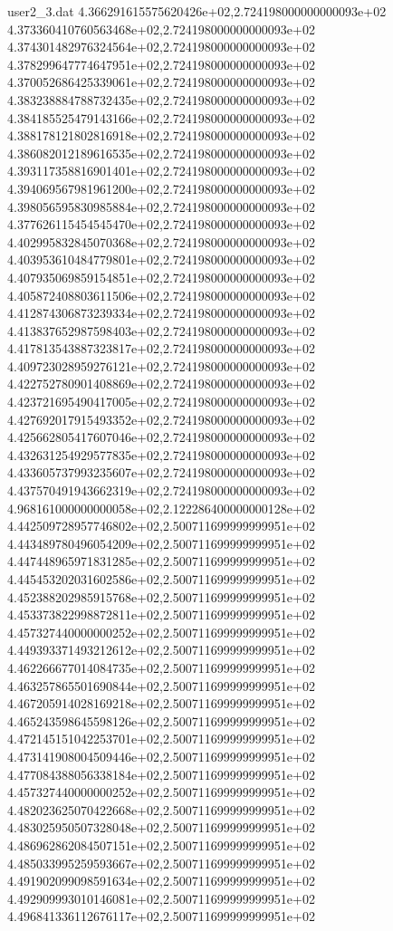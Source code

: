 \begin{filecontents}{user2_3.dat}
4.366291615575620426e+02,2.724198000000000093e+02
4.373360410760563468e+02,2.724198000000000093e+02
4.374301482976324564e+02,2.724198000000000093e+02
4.378299647774647951e+02,2.724198000000000093e+02
4.370052686425339061e+02,2.724198000000000093e+02
4.383238884788732435e+02,2.724198000000000093e+02
4.384185525479143166e+02,2.724198000000000093e+02
4.388178121802816918e+02,2.724198000000000093e+02
4.386082012189616535e+02,2.724198000000000093e+02
4.393117358816901401e+02,2.724198000000000093e+02
4.394069567981961200e+02,2.724198000000000093e+02
4.398056595830985884e+02,2.724198000000000093e+02
4.377626115454545470e+02,2.724198000000000093e+02
4.402995832845070368e+02,2.724198000000000093e+02
4.403953610484779801e+02,2.724198000000000093e+02
4.407935069859154851e+02,2.724198000000000093e+02
4.405872408803611506e+02,2.724198000000000093e+02
4.412874306873239334e+02,2.724198000000000093e+02
4.413837652987598403e+02,2.724198000000000093e+02
4.417813543887323817e+02,2.724198000000000093e+02
4.409723028959276121e+02,2.724198000000000093e+02
4.422752780901408869e+02,2.724198000000000093e+02
4.423721695490417005e+02,2.724198000000000093e+02
4.427692017915493352e+02,2.724198000000000093e+02
4.425662805417607046e+02,2.724198000000000093e+02
4.432631254929577835e+02,2.724198000000000093e+02
4.433605737993235607e+02,2.724198000000000093e+02
4.437570491943662319e+02,2.724198000000000093e+02
4.968161000000000058e+02,2.122286400000000128e+02
4.442509728957746802e+02,2.500711699999999951e+02
4.443489780496054209e+02,2.500711699999999951e+02
4.447448965971831285e+02,2.500711699999999951e+02
4.445453202031602586e+02,2.500711699999999951e+02
4.452388202985915768e+02,2.500711699999999951e+02
4.453373822998872811e+02,2.500711699999999951e+02
4.457327440000000252e+02,2.500711699999999951e+02
4.449393371493212612e+02,2.500711699999999951e+02
4.462266677014084735e+02,2.500711699999999951e+02
4.463257865501690844e+02,2.500711699999999951e+02
4.467205914028169218e+02,2.500711699999999951e+02
4.465243598645598126e+02,2.500711699999999951e+02
4.472145151042253701e+02,2.500711699999999951e+02
4.473141908004509446e+02,2.500711699999999951e+02
4.477084388056338184e+02,2.500711699999999951e+02
4.457327440000000252e+02,2.500711699999999951e+02
4.482023625070422668e+02,2.500711699999999951e+02
4.483025950507328048e+02,2.500711699999999951e+02
4.486962862084507151e+02,2.500711699999999951e+02
4.485033995259593667e+02,2.500711699999999951e+02
4.491902099098591634e+02,2.500711699999999951e+02
4.492909993010146081e+02,2.500711699999999951e+02
4.496841336112676117e+02,2.500711699999999951e+02

\end{filecontents}
